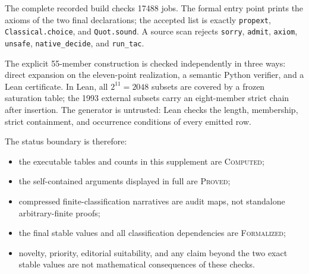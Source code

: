 \documentclass[11pt,a4paper]{article}
\theoremstyle{definition}
\newcommand{\code}[1]{\texttt{#1}}
\newcommand{\proved}{\textsc{Proved}}
\newcommand{\computed}{\textsc{Computed}}
\newcommand{\formalized}{\textsc{Formalized}}
\begin{document}
The complete recorded build checks 17488 jobs.  The formal entry point prints
the axioms of the two final declarations; the accepted list is exactly
\code{propext}, \code{Classical.choice}, and \code{Quot.sound}.  A source
scan rejects \code{sorry}, \code{admit}, \code{axiom}, \code{unsafe},
\code{native\_decide}, and \code{run\_tac}.

The explicit 55-member construction is checked independently in three ways:
direct expansion on the eleven-point realization, a semantic Python
verifier, and a Lean certificate.  In Lean, all $2^{11}=2048$ subsets are
covered by a frozen saturation table; the 1993 external subsets carry an
eight-member strict chain after insertion.  The generator is untrusted:
Lean checks the length, membership, strict containment, and occurrence
conditions of every emitted row.

The status boundary is therefore:
\begin{itemize}[leftmargin=8mm]
\item the executable tables and counts in this supplement are \computed;
\item the self-contained arguments displayed in full are \proved;
\item compressed finite-classification narratives are audit maps, not
  standalone arbitrary-finite proofs;
\item the final stable values and all classification dependencies are
  \mbox{\formalized};
\item novelty, priority, editorial suitability, and any claim beyond the two
  exact stable values are not mathematical consequences of these checks.
\end{itemize}
\end{document}
